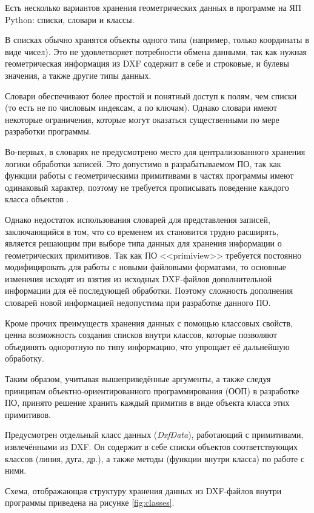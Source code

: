 Есть несколько вариантов хранения геометрических данных в программе на ЯП Python: списки, словари и классы.

В списках обычно хранятся объекты одного типа (например, только координаты в виде чисел). Это не удовлетворяет потребности обмена данными, так как нужная геометрическая информация из DXF содержит в себе и строковые, и булевы значения, а также другие типы данных.

Словари обеспечивают более простой и понятный доступ к полям, чем списки (то есть не по числовым индексам, а по ключам). Однако словари имеют некоторые ограничения, которые могут оказаться существенными по мере разработки программы.

Во-первых, в словарях не предусмотрено место для централизованного хранения логики обработки записей. Это допустимо в разрабатываемом ПО, так как функции работы с геометрическими примитивами в частях программы имеют одинаковый характер, поэтому не требуется прописывать поведение каждого класса объектов \cite{lutz2001programming}.

Однако недостаток использования словарей для представления записей, заключающийся в том, что со временем их становится трудно расширять, является решающим при выборе типа данных для хранения информации о геометрических примитивов. Так как ПО <<primiview>> требуется постоянно модифицировать для работы с новыми файловыми форматами, то основные изменения исходят из взятия из исходных DXF-файлов дополнительной информации для её последующей обработки. Поэтому сложность дополнения словарей новой информацией недопустима при разработке данного ПО.

Кроме прочих преимуществ хранения данных с помощью классовых свойств, ценна возможность создания списков внутри классов, которые позволяют объединять одноротную по типу информацию, что упрощает её дальнейшую обработку.

Таким образом, учитывая вышеприведённые аргументы, а также следуя принципам объектно-ориентированного программирования (ООП) в разработке ПО, принято решение хранить каждый примитив в виде объекта класса этих примитивов.

Предусмотрен отдельный класс данных (\textit{DxfData}), работающий с примитивами, извлечёнными из DXF. Он содержит в себе списки объектов соответствующих классов (линия, дуга, др.), а также методы (функции внутри класса) по работе с ними.

Схема, отображающая структуру хранения данных из DXF-файлов внутри программы приведена на рисунке \ref{fig:classes}.

